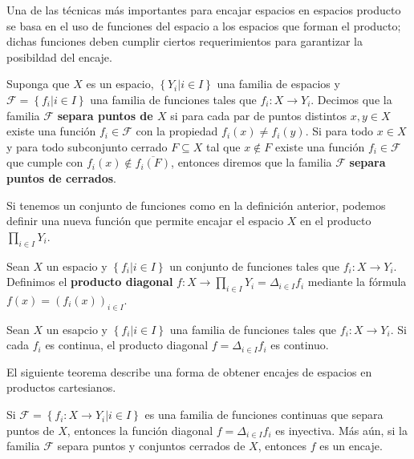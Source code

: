 \documentclass[12pt]{report}
\theoremstyle{largebreak}
\newcommand{\cf}[3]{\ensuremath{#1:#2\rightarrow#3}}
\begin{document}
    Una de las técnicas más importantes para encajar espacios en espacios producto se basa en el uso de funciones del espacio a los espacios que forman el producto; dichas funciones deben cumplir ciertos requerimientos para garantizar la posibildad del encaje.

    \begin{mydef}
        Suponga que $X$ es un espacio, $\left\{Y_i\big| i\in I \right\}$ una familia de espacios y $\mathcal{F}=\left\{f_i\big|i\in I \right\}$ una familia de funciones tales que $\cf{f_i}{X}{Y_i}$. Decimos que la familia $\mathcal{F}$ \textbf{separa puntos de $X$} si para cada par de puntos distintos $x,y\in X$ existe una función $f_i\in\mathcal{F}$ con la propiedad $f_i(x)\neq f_i(y)$. Si para todo $x\in X$ y para todo subconjunto cerrado $F\subseteq X$ tal que $x\notin F$ existe una función $f_i\in\mathcal{F}$ que cumple con $f_i(x)\notin \overline{f_i(F)}$, entonces diremos que la familia $\mathcal{F}$ \textbf{separa puntos de cerrados}.
    \end{mydef}

    Si tenemos un conjunto de funciones como en la definición anterior, podemos definir una nueva función que permite encajar el espacio $X$ en el producto $\prod_{i\in I}Y_i$.

    \begin{mydef}
        Sean $X$ un espacio y $\left\{f_i\big|i\in I \right\}$ un conjunto de funciones tales que $\cf{f_i}{X}{Y_i}$. Definimos el \textbf{producto diagonal} $\cf{f}{X}{\prod_{i\in I}Y_i}=\Delta_{i\in I}f_i$ mediante la fórmula $f(x)=(f_i(x))_{i\in I}$.
    \end{mydef}

    \begin{mydef}
        Sean $X$ un esapcio y $\left\{f_i\big|i\in I \right\}$ una familia de funciones tales que $\cf{f_i}{X}{Y_i}$. Si cada $f_i$ es continua, el producto diagonal $f=\Delta_{i\in I}f_i$ es continuo.
    \end{mydef}

    El siguiente teorema describe una forma de obtener encajes de espacios en productos cartesianos.

    \begin{theor}
        Si $\mathcal{F}=\left\{\cf{f_i}{X}{Y_i}\big|i\in I \right\}$ es una familia de funciones continuas que separa puntos de $X$, entonces la función diagonal $f=\Delta_{i\in I}f_i$ es inyectiva. Más aún, si la familia $\mathcal{F}$ separa puntos y conjuntos cerrados de $X$, entonces $f$ es un encaje.
    \end{theor}
\end{document}

